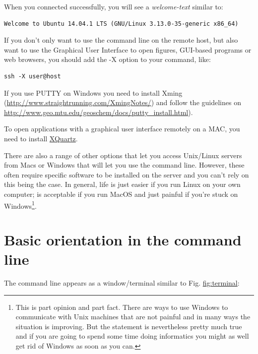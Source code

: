 \documentclass[11pt]{article}
\begin{document}
When you connected successfully, you will see a \emph{welcome-text} similar to:


\begin{verbatim}
Welcome to Ubuntu 14.04.1 LTS (GNU/Linux 3.13.0-35-generic x86_64)
\end{verbatim}


If you don't only want to use the command line on the remote host, but
also want to use the Graphical User Interface to open figures,
GUI-based programs or web browsers, you should add the -X option to
your command, like:


\begin{verbatim}
ssh -X user@host
\end{verbatim}

If you use PUTTY on Windows you need to install Xming
(\href{http://www.straightrunning.com/XmingNotes/}{http://www.straightrunning.com/XmingNotes/}) and follow the guidelines
on \href{http://www.geo.mtu.edu/geoschem/docs/putty_install.html}{http://www.geo.mtu.edu/geoschem/docs/putty\_install.html}).

To open applications with a graphical user interface remotely on a
MAC, you need to install \href{http://xquartz.macosforge.org/landing/}{XQuartz}.

There are also a range of other options that let you access Unix/Linux
servers from Macs or Windows that will let you use the command line. However,
these often require specific software to be installed on the server and you
can't rely on this being the case. In general, life is just easier if you run
Linux on your own computer; is acceptable if you run MacOS and just painful
if you're stuck on Windows\footnote{This is part opinion and part fact. There are ways to use Windows to
communicate with Unix machines that are not painful and in many ways the
situation is improving. But the statement is nevertheless pretty much true
and if you are going to spend some time doing informatics you might as well
get rid of Windows as soon as you can.
 }.
\section{Basic orientation in the command line}
\label{sec-2}


The command line appears as a window/terminal similar to
Fig. \hyperref[fig-terminal]{fig:terminal}:
\end{document}
